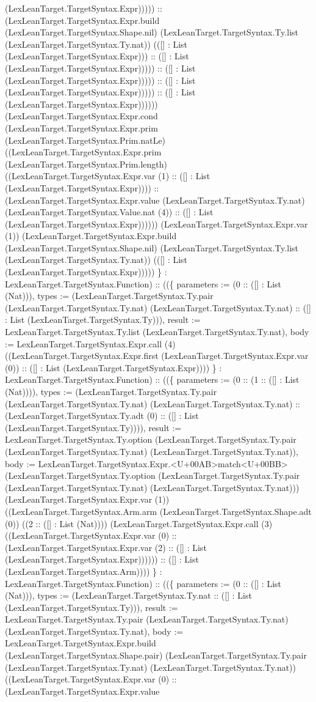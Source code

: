 \documentclass[11pt]{article}
\begin{document}
(LexLeanTarget.TargetSyntax.Expr))))) :: (LexLeanTarget.TargetSyntax.Expr.build (LexLeanTarget.TargetSyntax.Shape.nil) (LexLeanTarget.TargetSyntax.Ty.list (LexLeanTarget.TargetSyntax.Ty.nat)) (([] : List (LexLeanTarget.TargetSyntax.Expr))) :: ([] : List (LexLeanTarget.TargetSyntax.Expr))))) :: ([] : List (LexLeanTarget.TargetSyntax.Expr))))) :: ([] : List (LexLeanTarget.TargetSyntax.Expr))))) :: ([] : List (LexLeanTarget.TargetSyntax.Expr)))))) (LexLeanTarget.TargetSyntax.Expr.cond (LexLeanTarget.TargetSyntax.Expr.prim (LexLeanTarget.TargetSyntax.Prim.natLe) ((LexLeanTarget.TargetSyntax.Expr.prim (LexLeanTarget.TargetSyntax.Prim.length) ((LexLeanTarget.TargetSyntax.Expr.var (1) :: ([] : List (LexLeanTarget.TargetSyntax.Expr)))) :: (LexLeanTarget.TargetSyntax.Expr.value (LexLeanTarget.TargetSyntax.Ty.nat) (LexLeanTarget.TargetSyntax.Value.nat (4)) :: ([] : List (LexLeanTarget.TargetSyntax.Expr)))))) (LexLeanTarget.TargetSyntax.Expr.var (1)) (LexLeanTarget.TargetSyntax.Expr.build (LexLeanTarget.TargetSyntax.Shape.nil) (LexLeanTarget.TargetSyntax.Ty.list (LexLeanTarget.TargetSyntax.Ty.nat)) (([] : List (LexLeanTarget.TargetSyntax.Expr))))) \} : LexLeanTarget.TargetSyntax.Function) :: ((\{ parameters := (0 :: ([] : List (Nat))), types := (LexLeanTarget.TargetSyntax.Ty.pair (LexLeanTarget.TargetSyntax.Ty.nat) (LexLeanTarget.TargetSyntax.Ty.nat) :: ([] : List (LexLeanTarget.TargetSyntax.Ty))), result := LexLeanTarget.TargetSyntax.Ty.list (LexLeanTarget.TargetSyntax.Ty.nat), body := LexLeanTarget.TargetSyntax.Expr.call (4) ((LexLeanTarget.TargetSyntax.Expr.first (LexLeanTarget.TargetSyntax.Expr.var (0)) :: ([] : List (LexLeanTarget.TargetSyntax.Expr)))) \} : LexLeanTarget.TargetSyntax.Function) :: ((\{ parameters := (0 :: (1 :: ([] : List (Nat)))), types := (LexLeanTarget.TargetSyntax.Ty.pair (LexLeanTarget.TargetSyntax.Ty.nat) (LexLeanTarget.TargetSyntax.Ty.nat) :: (LexLeanTarget.TargetSyntax.Ty.adt (0) :: ([] : List (LexLeanTarget.TargetSyntax.Ty)))), result := LexLeanTarget.TargetSyntax.Ty.option (LexLeanTarget.TargetSyntax.Ty.pair (LexLeanTarget.TargetSyntax.Ty.nat) (LexLeanTarget.TargetSyntax.Ty.nat)), body := LexLeanTarget.TargetSyntax.Expr.<U+00AB>match<U+00BB> (LexLeanTarget.TargetSyntax.Ty.option (LexLeanTarget.TargetSyntax.Ty.pair (LexLeanTarget.TargetSyntax.Ty.nat) (LexLeanTarget.TargetSyntax.Ty.nat))) (LexLeanTarget.TargetSyntax.Expr.var (1)) ((LexLeanTarget.TargetSyntax.Arm.arm (LexLeanTarget.TargetSyntax.Shape.adt (0)) ((2 :: ([] : List (Nat)))) (LexLeanTarget.TargetSyntax.Expr.call (3) ((LexLeanTarget.TargetSyntax.Expr.var (0) :: (LexLeanTarget.TargetSyntax.Expr.var (2) :: ([] : List (LexLeanTarget.TargetSyntax.Expr)))))) :: ([] : List (LexLeanTarget.TargetSyntax.Arm)))) \} : LexLeanTarget.TargetSyntax.Function) :: ((\{ parameters := (0 :: ([] : List (Nat))), types := (LexLeanTarget.TargetSyntax.Ty.nat :: ([] : List (LexLeanTarget.TargetSyntax.Ty))), result := LexLeanTarget.TargetSyntax.Ty.pair (LexLeanTarget.TargetSyntax.Ty.nat) (LexLeanTarget.TargetSyntax.Ty.nat), body := LexLeanTarget.TargetSyntax.Expr.build (LexLeanTarget.TargetSyntax.Shape.pair) (LexLeanTarget.TargetSyntax.Ty.pair (LexLeanTarget.TargetSyntax.Ty.nat) (LexLeanTarget.TargetSyntax.Ty.nat)) ((LexLeanTarget.TargetSyntax.Expr.var (0) :: (LexLeanTarget.TargetSyntax.Expr.value 
\end{document}
